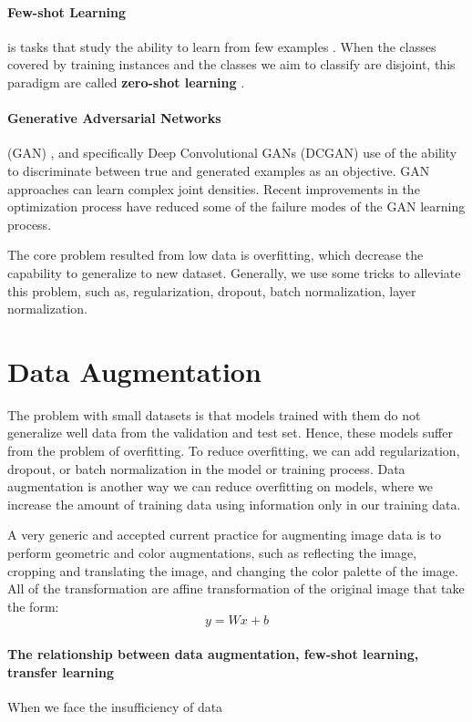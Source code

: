 \documentclass{article}
\begin{document}
\paragraph{Few-shot Learning} is tasks that study the ability to learn from few examples \cite{garcia2017few}. When the classes covered by training instances and the classes we aim to classify are disjoint, this paradigm are called \textbf{zero-shot learning} \cite{wang2019survey}.


\paragraph{Generative Adversarial Networks} (GAN) \cite{goodfellow2014generative}, and specifically Deep Convolutional GANs (DCGAN)  use of the ability to discriminate between true and generated examples as an objective. GAN approaches can learn complex joint densities. Recent improvements in the optimization process have reduced some of the failure modes of the GAN learning process.


The core problem resulted from low data is overfitting, which decrease the capability to generalize to new dataset. Generally, we use some tricks to alleviate this problem, such as, regularization, dropout, batch normalization, layer normalization.

\section{Data Augmentation}

The problem with small datasets is that models trained with them do not generalize well data from the validation and test set. Hence, these models suffer from the problem of overfitting. To reduce overfitting, we can add regularization, dropout, or batch normalization in the model or training process. Data augmentation is another way we can reduce overfitting on models, where we increase the amount of training data using information only in our training data.

A very generic and accepted current practice for augmenting image data is to perform geometric and color augmentations, such as reflecting the image, cropping and translating the image, and changing the color palette of the image. All of the transformation are affine transformation of the original image that take the form:
\[
y=Wx+b
\]

\paragraph{The relationship between data augmentation, few-shot learning, transfer learning} When we face the insufficiency of data 
\end{document}
